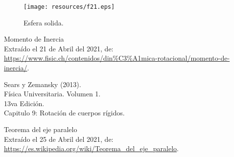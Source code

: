 \documentclass[letter,oneside,11pt]{article}
\begin{document}
\begin{figure}
\centering
\texttt{[image: resources/f21.eps]}
\caption{Esfera solida.}
\label{figura21}
\end{figure}


\begin{thebibliography}{99}

 Momento de Inercia \\
Extraído el 21 de Abril del 2021, de: \\
\url{https://www.fisic.ch/contenidos/din%C3%A1mica-rotacional/momento-de-inercia/}.
 
 Sears y Zemansky (2013).\\
Física Universitaria. Volumen 1.\\
13va Edición.\\
Capitulo 9: Rotación de cuerpos rígidos.

 Teorema del eje paralelo \\
Extraído el 25 de Abril del 2021, de: \\
\url{https://es.wikipedia.org/wiki/Teorema_del_eje_paralelo}.

\end{thebibliography}
\end{document}
